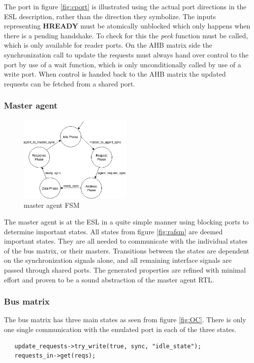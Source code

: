 The port in figure \ref{fig:cport} is illustrated using the actual port directions in the ESL description, rather than the direction they symbolize. The inputs representing \textbf{HREADY} must be atomically unblocked which only happens when there is a pending handshake. To check for this the \textit{peek} function must be called, which is only available for reader ports. On the AHB matrix side the synchronization call to update the requests must always hand over control to the port by use of a wait function, which is only unconditionally called by use of a write port. When control is handed back to the AHB matrix the updated requests can be fetched from a shared port. 

\subsubsection{Master agent}
\begin{figure}
\includegraphics[width=5.5cm]{figs/ESL/mAgent_ESL.png}
\caption{master agent FSM}\label{fig:eafsm}
\end{figure}
The master agent is at the ESL in a quite simple manner using blocking ports to determine important states. All states from figure \ref{fig:rafsm} are deemed important states. They are all needed to communicate with the individual states of the bus matrix, or their masters. Transitions between the states are dependent on the synchronization signals alone, and all remaining interface signals are passed through shared ports. The generated properties are refined with minimal effort and proven to be a sound abstraction of the master agent RTL.  \\
\newline  

\subsubsection{Bus matrix}
The bus matrix has three main states as seen from figure \ref{fig:OC}. There is only one single communication with the emulated port in each of the three states. 
\begin{lstlisting}
   update_requests->try_write(true, sync, "idle_state");
   requests_in->get(reqs);
\end{lstlisting}

